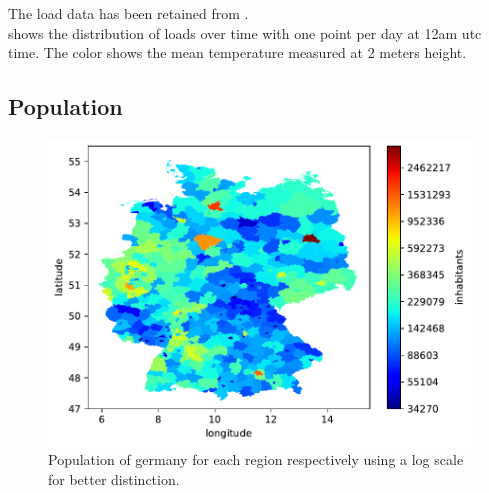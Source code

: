 The load data has been retained from .\\
 shows the distribution of loads over time with one point per day at 12am utc time. The color shows the mean temperature measured at 2 meters height.\\




\subsection{Population}

\begin{figure}[h!]%
\centering
\includegraphics[width=\textwidth]{plots/demo/demo2018_logscale}%
\caption{Population of germany for each region respectively using a log scale for better distinction.}%
\label{fig:demo2018_logscale}%
\end{figure}




